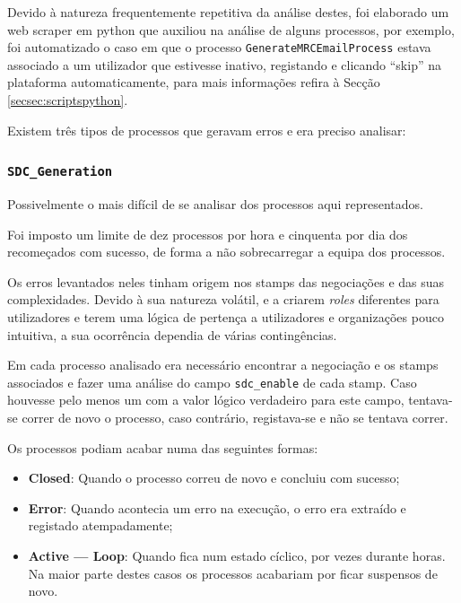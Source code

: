         Devido à natureza frequentemente repetitiva da análise destes, foi elaborado um web scraper em python que auxiliou na análise de alguns processos, por exemplo, foi automatizado o caso em que o processo \texttt{GenerateMRCEmailProcess} estava associado a um utilizador que estivesse inativo, registando e clicando ``skip'' na plataforma automaticamente, para mais informações refira à Secção \ref{secsec:scriptspython}.

        Existem três tipos de processos que geravam erros e era preciso analisar:

        \subsubsection{\texttt{SDC\_Generation}}\label{secsec:sdc_generation}


            Possivelmente o mais difícil de se analisar dos processos aqui representados.

            Foi imposto um limite de dez processos por hora e cinquenta por dia dos recomeçados com sucesso, de forma a não sobrecarregar a equipa dos processos.

            Os erros levantados neles tinham origem nos stamps das negociações e das suas complexidades. Devido à sua natureza volátil, e a criarem \textit{roles} diferentes para utilizadores e terem uma lógica de pertença a utilizadores e organizações pouco intuitiva, a sua ocorrência dependia de várias contingências.

            Em cada processo analisado era necessário encontrar a negociação e os stamps associados e fazer uma análise do campo \texttt{sdc\_enable} de cada stamp. Caso houvesse pelo menos um com a valor lógico verdadeiro para este campo, tentava-se correr de novo o processo, caso contrário, registava-se e não se tentava correr.
            
            Os processos podiam acabar numa das seguintes formas:
            \begin{itemize}
                \item \textbf{Closed}: Quando o processo correu de novo e concluiu com sucesso;
                \item \textbf{Error}: Quando acontecia um erro na execução, o erro era extraído e registado atempadamente;
                \item \textbf{Active --- Loop}: Quando fica num estado cíclico, por vezes durante horas. Na maior parte destes casos os processos acabariam por ficar suspensos de novo.
            \end{itemize}

